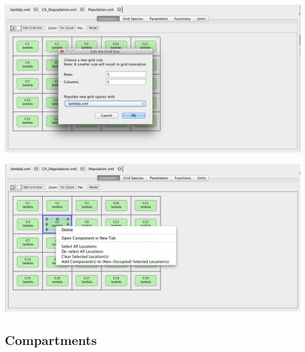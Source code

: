 \documentclass[titlepage,11pt]{article}
\begin{document}
\begin{center}
\includegraphics[width=160mm]{screenshots/editGridSize}
\end{center}

\begin{center}
\includegraphics[width=160mm]{screenshots/gridRightButton}
\end{center}

\subsection{\label{Compartments}Compartments}
\end{document}

